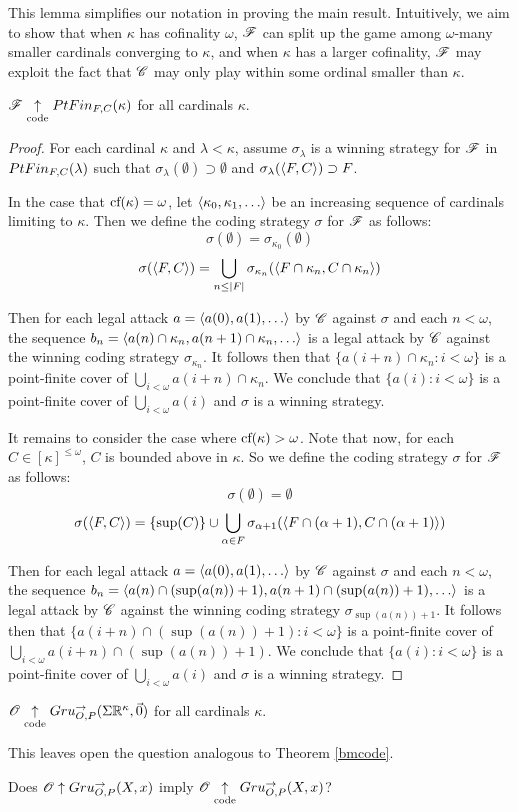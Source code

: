 This lemma simplifies our notation in proving the main result. Intuitively, we
aim to show that when $\kappa$ has cofinality $\omega$, $\mathscr{F}$ can split up
the game among $\omega$-many smaller cardinals converging to $\kappa$, and
when $\kappa$ has a larger cofinality, $\mathscr{F}$ may exploit the fact that $\mathscr{C}$
may only play within some ordinal smaller than $\kappa$.

\begin{thm}
  $\mathscr{F} \underset{\text{code}}{\uparrow} PtFin_{F,C}(\kappa)$ for all cardinals $\kappa$.
\end{thm}

\begin{proof}
  For each cardinal $\kappa$ and $\lambda<\kappa$,
  assume $\sigma_\lambda$ is a winning strategy for $\mathscr{F}$ in $PtFin_{F,C}(\lambda)$
  such that $\sigma_\lambda(\emptyset)\supset\emptyset$ and
  $\sigma_\lambda(\langle F,C\rangle)\supset F$.

  In the case that $\textrm{cf}(\kappa)=\omega$, let $\<\kappa_0,\kappa_1,\dots\>$ be
  an increasing sequence of cardinals limiting to $\kappa$. Then we define
  the coding strategy $\sigma$ for $\mathscr{F}$ as follows:
    \[
      \sigma(\emptyset) = \sigma_{\kappa_0}(\emptyset)
    \]
    \[
      \sigma(\langle F,C\rangle)
        =
      \bigcup_{n\leq|F|}
      \sigma_{\kappa_n}(\langle F\cap \kappa_n,C\cap \kappa_n\rangle)
    \]

  Then for each legal attack $a=\<a(0),a(1),\dots\>$ by $\mathscr{C}$ against $\sigma$
  and each $n<\omega$, the sequence
  $b_n=\<a(n)\cap \kappa_n,a(n+1)\cap \kappa_n,\dots\>$
  is a legal attack by $\mathscr{C}$ against the winning coding strategy
  $\sigma_{\kappa_n}$. It follows then that $\{a(i+n)\cap \kappa_n:i<\omega\}$
  is a point-finite cover of $\bigcup_{i<\omega}a(i+n)\cap \kappa_n$. We
  conclude that $\{a(i):i<\omega\}$ is a point-finite cover of
  $\bigcup_{i<\omega}a(i)$ and $\sigma$ is a winning strategy.

  It remains to consider the case where $\textrm{cf}(\kappa)>\omega$. Note that now, for
  each $C\in[\kappa]^{\leq\omega}$, $C$ is bounded above in $\kappa$. So we
  define the coding strategy $\sigma$ for $\mathscr{F}$ as follows:
    \[
      \sigma(\emptyset) = \emptyset
    \]
    \[
      \sigma(\langle F,C\rangle)
        =
      \{\sup(C)\}
        \cup
      \bigcup_{\alpha\in F}
      \sigma_{\alpha+1}(\langle F\cap(\alpha+1),C\cap(\alpha+1)\rangle)
    \]

  Then for each legal attack $a=\<a(0),a(1),\dots\>$ by $\mathscr{C}$ against $\sigma$
  and each $n<\omega$, the sequence
  $b_n=\<a(n)\cap (\sup(a(n))+1),a(n+1)\cap (\sup(a(n))+1),\dots\>$
  is a legal attack by $\mathscr{C}$ against the winning coding strategy
  $\sigma_{\sup(a(n))+1}$. It follows then that
  $\{a(i+n)\cap (\sup(a(n))+1):i<\omega\}$
  is a point-finite cover of $\bigcup_{i<\omega}a(i+n)\cap(\sup(a(n))+1)$. We
  conclude that $\{a(i):i<\omega\}$ is a point-finite cover of
  $\bigcup_{i<\omega}a(i)$ and $\sigma$ is a winning strategy.
\end{proof}

\begin{cor}
  $\mathscr{O}\underset{\text{code}}{\uparrow}Gru_{O,P}^{\to}(\Sigma\mathbb{R}^{\kappa},\vec{0})$
  for all cardinals $\kappa$.
\end{cor}

This leaves open the question analogous to Theorem \ref{bmcode}.

\begin{ques}
  Does $\mathscr{O} \uparrow Gru_{O,P}^{\to}(X,x)$ imply $\mathscr{O} \underset{\text{code}}{\uparrow}Gru_{O,P}^{\to}(X,x)$?
\end{ques}
